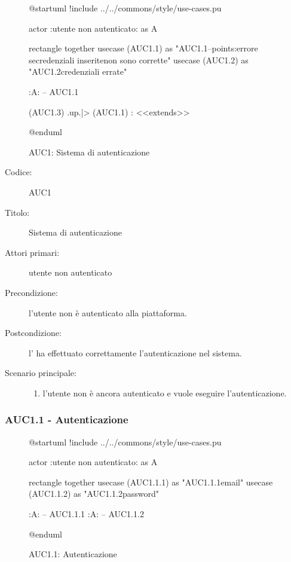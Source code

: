 \documentclass[../../../analisi-dei-requisiti.tex]{subfiles}
\begin{document}
\begin{figure}[H]
  \centering
  \begin{plantuml}
  @startuml
  !include ../../commons/style/use-cases.pu

  actor :utente non autenticato: as A

  rectangle {
    together {
      usecase (AUC1.1) as "AUC1.1\nAutenticazione\n--\nExtension points:\nVisualizzazione errore se\nle credenziali inserite\n non sono corrette"
      usecase (AUC1.2) as "AUC1.2\nVisualizzazione credenziali errate"
    }
  }

  :A: -- AUC1.1

  (AUC1.3) .up.|> (AUC1.1) : <<extends>>

  @enduml
  \end{plantuml}
  \caption{AUC1: Sistema di autenticazione}
  \label{fig:auc1}
\end{figure}

\begin{description}
  \item[Codice:] AUC1
  \item[Titolo:] Sistema di autenticazione
  \item[Attori primari:] utente non autenticato
  \item[Precondizione:] l'utente non è autenticato alla piattaforma.
  \item[Postcondizione:] l' ha effettuato correttamente l'autenticazione nel sistema.
  \item[Scenario principale:]
  \begin{enumerate}
    \item l'utente non è ancora autenticato e vuole eseguire l'autenticazione.
  \end{enumerate}
\end{description}

\subsubsection{AUC1.1 - Autenticazione}%
\label{subs:AUC1.1}

\begin{figure}[H]
  \centering
  \begin{plantuml}
  @startuml
  !include ../../commons/style/use-cases.pu

  actor :utente non autenticato: as A

  rectangle {
    together {
    usecase (AUC1.1.1) as "AUC1.1.1\nInserimento email"
    usecase (AUC1.1.2) as "AUC1.1.2\nInserimento password"
    }
  }

  :A: -- AUC1.1.1
  :A: -- AUC1.1.2

  @enduml
  \end{plantuml}
  \caption{AUC1.1: Autenticazione}
  \label{fig:auc1_1}
\end{figure}
\end{document}

